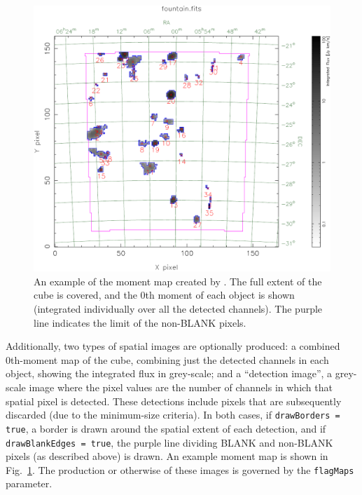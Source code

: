 \label{sec-spatialmaps}

\begin{figure}[!t]
  \begin{center}
    \includegraphics[width=\textwidth]{example_moment_map}
  \end{center}
  \caption{\footnotesize An example of the moment map created by
    \duchamp. The full extent of the cube is covered, and the 0th moment
    of each object is shown (integrated individually over all the
    detected channels). The purple line indicates the limit of the
    non-BLANK pixels.}
  \label{fig-moment}
\end{figure}

Additionally, two types of spatial images are optionally produced: a
combined 0th-moment map of the cube, combining just the detected
channels in each object, showing the integrated flux in grey-scale;
and a ``detection image'', a grey-scale image where the pixel values
are the number of channels in which that spatial pixel is
detected. These detections include pixels that are subsequently
discarded (due to the minimum-size criteria). In both cases, if
\texttt{drawBorders = true}, a border is drawn around the spatial
extent of each detection, and if \texttt{drawBlankEdges = true}, the
purple line dividing BLANK and non-BLANK pixels (as described above)
is drawn. An example moment map is shown in Fig.~\ref{fig-moment}.
The production or otherwise of these images is governed by the
\texttt{flagMaps} parameter.

